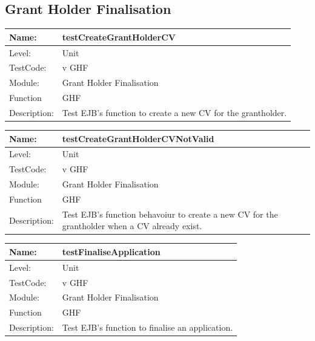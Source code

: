 \documentclass[12pt]{article}
\begin{document}
\begin{flushleft}
\subsection{Grant Holder Finalisation}

\begin{center}
\begin{tabular}{|l|p{12cm}|}
\hline

 Name: & testCreateGrantHolderCV  \\
\hline
Level: & Unit \\
\hline
TestCode: & v GHF \\
\hline
Module:& Grant Holder Finalisation \\
\hline
Function & GHF \\
\hline
Description: & Test EJB's function to create a new CV for the grantholder. \\
\hline
\end{tabular}
\end{center}

\begin{center}
\begin{tabular}{|l|p{12cm}|}
\hline

 Name: & testCreateGrantHolderCVNotValid  \\
\hline
Level: & Unit \\
\hline
TestCode: & v GHF \\
\hline
Module:& Grant Holder Finalisation \\
\hline
Function & GHF \\
\hline
Description: & Test EJB's function behavoiur to create a new CV for the grantholder when a CV already exist. \\
\hline
\end{tabular}
\end{center}

\begin{center}
\begin{tabular}{|l|p{12cm}|}
\hline

 Name: & testFinaliseApplication  \\
\hline
Level: & Unit \\
\hline
TestCode: & v GHF \\
\hline
Module:& Grant Holder Finalisation \\
\hline
Function & GHF \\
\hline
Description: & Test EJB's function to finalise an application. \\
\hline
\end{tabular}
\end{center}


\end{flushleft}
\end{document}
